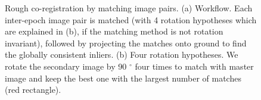 \begin{figure}[htbp]
    \begin{center}
        \caption{Rough co-registration by matching image pairs. (a) Workflow. Each inter-epoch image pair is matched (with 4 rotation hypotheses which are explained in (b), if the matching method is not rotation invariant), followed by projecting the matches onto ground to find the globally consistent inliers. (b) Four rotation hypotheses. We rotate the secondary image by 90 $^\circ$ four times to match with master image and keep the best one with the largest number of matches (red rectangle).}
        \label{WorkflowImgPair}
    \end{center}
\end{figure}

